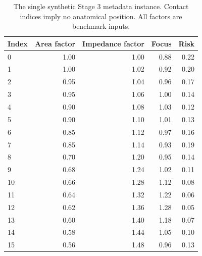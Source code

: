 \begin{table}[htbp]\centering
\caption{The single synthetic Stage 3 metadata instance. Contact indices imply no anatomical position. All factors are benchmark inputs.}\label{tab:metadata}
\small
\setlength{\tabcolsep}{4pt}
\begin{tabular}{lrrrr}\toprule
Index & Area factor & Impedance factor & Focus & Risk \\ \midrule
0 & 1.00 & 1.00 & 0.88 & 0.22 \\
1 & 1.00 & 1.02 & 0.92 & 0.20 \\
2 & 0.95 & 1.04 & 0.96 & 0.17 \\
3 & 0.95 & 1.06 & 1.00 & 0.14 \\
4 & 0.90 & 1.08 & 1.03 & 0.12 \\
5 & 0.90 & 1.10 & 1.01 & 0.13 \\
6 & 0.85 & 1.12 & 0.97 & 0.16 \\
7 & 0.85 & 1.14 & 0.93 & 0.19 \\
8 & 0.70 & 1.20 & 0.95 & 0.14 \\
9 & 0.68 & 1.24 & 1.02 & 0.11 \\
10 & 0.66 & 1.28 & 1.12 & 0.08 \\
11 & 0.64 & 1.32 & 1.22 & 0.06 \\
12 & 0.62 & 1.36 & 1.28 & 0.05 \\
13 & 0.60 & 1.40 & 1.18 & 0.07 \\
14 & 0.58 & 1.44 & 1.05 & 0.10 \\
15 & 0.56 & 1.48 & 0.96 & 0.13 \\
\bottomrule\end{tabular}
\end{table}
